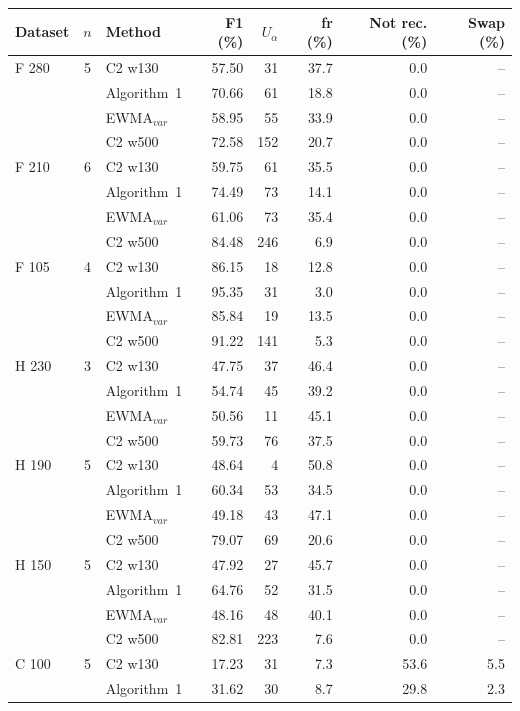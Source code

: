 \begin{tabular}{lclrrrrr}
\hline
Dataset & $n$ & Method & F1 (\%) & $U_\alpha$ & fr (\%) & Not rec. (\%) & Swap (\%) \\ \hline
F  280 & 5 & C2 w130 & 57.50 & 31 & 37.7 & 0.0 & -- \\
 &  & Algorithm~1 & 70.66 & 61 & 18.8 & 0.0 & -- \\
 &  & EWMA$_{var}$ & 58.95 & 55 & 33.9 & 0.0 & -- \\
 &  & C2 w500 & 72.58 & 152 & 20.7 & 0.0 & -- \\
\hline
F  210 & 6 & C2 w130 & 59.75 & 61 & 35.5 & 0.0 & -- \\
 &  & Algorithm~1 & 74.49 & 73 & 14.1 & 0.0 & -- \\
 &  & EWMA$_{var}$ & 61.06 & 73 & 35.4 & 0.0 & -- \\
 &  & C2 w500 & 84.48 & 246 & 6.9 & 0.0 & -- \\
\hline
F  105 & 4 & C2 w130 & 86.15 & 18 & 12.8 & 0.0 & -- \\
 &  & Algorithm~1 & 95.35 & 31 & 3.0 & 0.0 & -- \\
 &  & EWMA$_{var}$ & 85.84 & 19 & 13.5 & 0.0 & -- \\
 &  & C2 w500 & 91.22 & 141 & 5.3 & 0.0 & -- \\
\hline
H  230 & 3 & C2 w130 & 47.75 & 37 & 46.4 & 0.0 & -- \\
 &  & Algorithm~1 & 54.74 & 45 & 39.2 & 0.0 & -- \\
 &  & EWMA$_{var}$ & 50.56 & 11 & 45.1 & 0.0 & -- \\
 &  & C2 w500 & 59.73 & 76 & 37.5 & 0.0 & -- \\
\hline
H  190 & 5 & C2 w130 & 48.64 & 4 & 50.8 & 0.0 & -- \\
 &  & Algorithm~1 & 60.34 & 53 & 34.5 & 0.0 & -- \\
 &  & EWMA$_{var}$ & 49.18 & 43 & 47.1 & 0.0 & -- \\
 &  & C2 w500 & 79.07 & 69 & 20.6 & 0.0 & -- \\
\hline
H  150 & 5 & C2 w130 & 47.92 & 27 & 45.7 & 0.0 & -- \\
 &  & Algorithm~1 & 64.76 & 52 & 31.5 & 0.0 & -- \\
 &  & EWMA$_{var}$ & 48.16 & 48 & 40.1 & 0.0 & -- \\
 &  & C2 w500 & 82.81 & 223 & 7.6 & 0.0 & -- \\
\hline
C  100 & 5 & C2 w130 & 17.23 & 31 & 7.3 & 53.6 & 5.5 \\
 &  & Algorithm~1 & 31.62 & 30 & 8.7 & 29.8 & 2.3 \\

\end{tabular}
